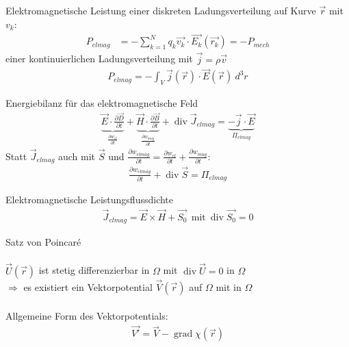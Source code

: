 \documentclass[a6paper]{kartei}
\begin{document}
\begin{karte}{Elektromagnetische Leistung }
einer diskreten Ladungsverteilung auf Kurve $\vec r$ mit $v_k$:
 \begin{eqnarray*}
  P_{elmag} & =  - \sum_{k=1}^{N} q_{k} \vec{v_{k}} \cdot \vec{E_{k}}(\vec{r_{k}}) = - P_{mech}
 \end{eqnarray*}
einer kontinuierlichen Ladungsverteilung mit $\vec j = \rho \vec v$
 \begin{eqnarray*}
  P_{elmag} = - \int_{V} \vec{j}(\vec{r}) \cdot \vec{E}(\vec{r}) \ d^{3}r
 \end{eqnarray*}

\end{karte}


\begin{karte}{Energiebilanz für das elektromagnetische Feld}
 \begin{eqnarray*}
  \underbrace{\vec{E} \cdot \frac{\partial \vec{D}}{\partial t}}_{\frac{\partial w_{el}}{\partial t}} +
  \underbrace{\vec{H} \cdot \frac{\partial \vec{B}}{\partial t}}_{\frac{\partial w_{mag}}{\partial t}}
   + \operatorname{div} \vec{J}_{elmag} = \underbrace{-\vec{j} \cdot \vec{E}}_{\Pi_{elmag}}
 \end{eqnarray*}
Statt $\vec J_{elmag}$ auch mit $\vec S$ und  $\frac{\partial w_{elmag}}{\partial t}=\frac{\partial w_{el}}{\partial t}+\frac{\partial w_{mag}}{\partial t}$:
 \begin{eqnarray*}
 \frac{\partial w_{elmag}}{\partial t}    + \operatorname{div} \vec{S} =\Pi_{elmag}
 \end{eqnarray*}
\end{karte}


\begin{karte}{Elektromagnetische Leistungsflussdichte}
 \begin{eqnarray*}
  \vec{J}_{elmag} = \vec{E} \times \vec{H} + \vec{S_{0}} \ \ \text{mit} \ \operatorname{div} \vec{S_{0}} = 0
 \end{eqnarray*}
\end{karte}



\begin{karte}{Satz von Poincaré}
 \ \\ \ \\$\vec{U}(\vec{r})$ ist stetig differenzierbar in $\Omega$ mit $\operatorname{div} \vec{U} = 0$ in $\Omega$\\$ \Rightarrow$ es
existiert ein Vektorpotential $\vec{V}(\vec{r})$ auf $\Omega$ mit  in $\Omega$
\\\ \\Allgemeine Form des Vektorpotentials:
 \begin{eqnarray*}
  \vec{V'} = \vec{V} - \operatorname{grad} \chi(\vec{r})
 \end{eqnarray*}
\end{karte}
\end{document}
